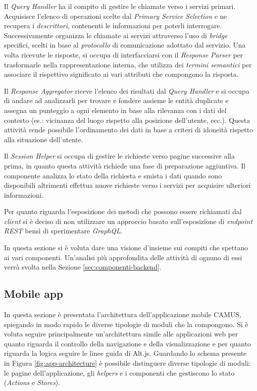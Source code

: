 Il \emph{Query Handler} ha il compito di gestire le chiamate verso i servizi primari. Acquisisce l'elenco di operazioni scelte dal \emph{Primary Service Selection} e ne recupera i \emph{descrittori}, contenenti le informazioni per poterli interrogare. Successivamente organizza le chiamate ai servizi attraverso l'uso di \emph{bridge} specifici, scelti in base al \emph{protocollo} di comunicazione adottato dal servizio. Una volta ricevute le risposte, si occupa di interfacciarsi con il \emph{Response Parser} per trasformarle nella rappresentazione interna, che utilizza dei \emph{termini semantici} per associare il rispettivo significato ai vari attributi che compongono la risposta.

Il \emph{Response Aggregator} riceve l'elenco dei risultati dal \emph{Query Handler} e si occupa di andare ad analizzarli per trovare e fondere assieme le entità duplicate e assegna un punteggio a ogni elemento in base alla rilevanza con i dati del contesto (es.: vicinanza del luogo rispetto alla posizione dell'utente, ecc.). Questa attività rende possibile l'ordinamento dei dati in base a criteri di idoneità rispetto alla situazione dell'utente.

Il \emph{Session Helper} si occupa di gestire le richieste verso pagine successive alla prima, in quanto questa attività richiede una fase di preparazione aggiuntiva. Il componente analizza lo stato della richiesta e smista i dati quando sono disponibili altrimenti effettua nuove richieste verso i servizi per acquisire ulteriori informazioni.

Per quanto riguarda l'esposizione dei metodi che possono essere richiamati dal \emph{client} si è deciso di non utilizzare un approccio basato sull'esposizione di \emph{endpoint} \emph{REST} bensì di sperimentare \emph{GraphQL}.

In questa sezione si è voluta dare una visione d'insieme sui compiti che spettano ai vari componenti. Un'analisi più approfondita delle attività di ognuno di essi verrà svolta nella Sezione \ref{sec:componenti-backend}.

\subsection{Mobile app}\label{sec:architettura-applicazione}

In questa sezione è presentata l'architettura dell'applicazione mobile CAMUS, spiegando in modo rapido le diverse tipologie di moduli che la compongono. Si è voluta seguire principalmente un'architettura simile alle applicazioni web per quanto riguarda il controllo della navigazione e della visualizzazione e per quanto riguarda la logica seguire le linee guida di Alt.js. Guardando lo schema presente in Figura \ref{fig:app-architecture} è possibile distinguere diverse tipologie di moduli: le pagine dell'applicazione, gli \emph{helpers} e i componenti che gestiscono lo stato (\emph{Actions} e \emph{Stores}).

